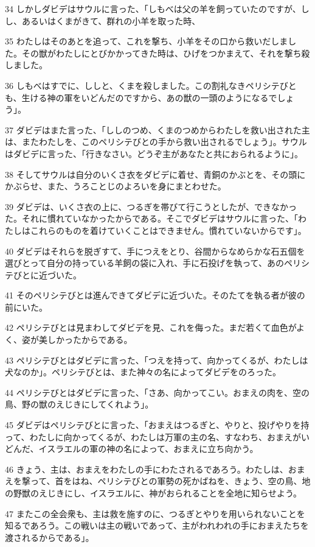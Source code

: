 \par 34 しかしダビデはサウルに言った、「しもべは父の羊を飼っていたのですが、しし、あるいはくまがきて、群れの小羊を取った時、
\par 35 わたしはそのあとを追って、これを撃ち、小羊をその口から救いだしました。その獣がわたしにとびかかってきた時は、ひげをつかまえて、それを撃ち殺しました。
\par 36 しもべはすでに、ししと、くまを殺しました。この割礼なきペリシテびとも、生ける神の軍をいどんだのですから、あの獣の一頭のようになるでしょう」。
\par 37 ダビデはまた言った、「ししのつめ、くまのつめからわたしを救い出された主は、またわたしを、このペリシテびとの手から救い出されるでしょう」。サウルはダビデに言った、「行きなさい。どうぞ主があなたと共におられるように」。
\par 38 そしてサウルは自分のいくさ衣をダビデに着せ、青銅のかぶとを、その頭にかぶらせ、また、うろことじのよろいを身にまとわせた。
\par 39 ダビデは、いくさ衣の上に、つるぎを帯びて行こうとしたが、できなかった。それに慣れていなかったからである。そこでダビデはサウルに言った、「わたしはこれらのものを着けていくことはできません。慣れていないからです」。
\par 40 ダビデはそれらを脱ぎすて、手につえをとり、谷間からなめらかな石五個を選びとって自分の持っている羊飼の袋に入れ、手に石投げを執って、あのペリシテびとに近づいた。
\par 41 そのペリシテびとは進んできてダビデに近づいた。そのたてを執る者が彼の前にいた。
\par 42 ペリシテびとは見まわしてダビデを見、これを侮った。まだ若くて血色がよく、姿が美しかったからである。
\par 43 ペリシテびとはダビデに言った、「つえを持って、向かってくるが、わたしは犬なのか」。ペリシテびとは、また神々の名によってダビデをのろった。
\par 44 ペリシテびとはダビデに言った、「さあ、向かってこい。おまえの肉を、空の鳥、野の獣のえじきにしてくれよう」。
\par 45 ダビデはペリシテびとに言った、「おまえはつるぎと、やりと、投げやりを持って、わたしに向かってくるが、わたしは万軍の主の名、すなわち、おまえがいどんだ、イスラエルの軍の神の名によって、おまえに立ち向かう。
\par 46 きょう、主は、おまえをわたしの手にわたされるであろう。わたしは、おまえを撃って、首をはね、ペリシテびとの軍勢の死かばねを、きょう、空の鳥、地の野獣のえじきにし、イスラエルに、神がおられることを全地に知らせよう。
\par 47 またこの全会衆も、主は救を施すのに、つるぎとやりを用いられないことを知るであろう。この戦いは主の戦いであって、主がわれわれの手におまえたちを渡されるからである」。
